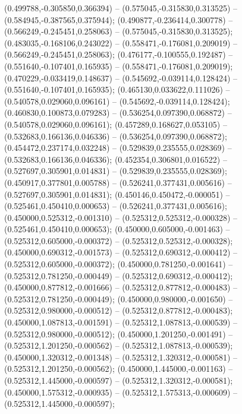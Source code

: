  (0.499788,-0.305850,0.366394) -- (0.575045,-0.315830,0.313525) -- (0.584945,-0.387565,0.375944);
 (0.490877,-0.236414,0.300778) -- (0.566249,-0.245451,0.258063) -- (0.575045,-0.315830,0.313525);
 (0.483035,-0.168106,0.243022) -- (0.558471,-0.176081,0.209019) -- (0.566249,-0.245451,0.258063);
 (0.476177,-0.100555,0.192487) -- (0.551640,-0.107401,0.165935) -- (0.558471,-0.176081,0.209019);
 (0.470229,-0.033419,0.148637) -- (0.545692,-0.039114,0.128424) -- (0.551640,-0.107401,0.165935);
 (0.465130,0.033622,0.111026) -- (0.540578,0.029060,0.096161) -- (0.545692,-0.039114,0.128424);
 (0.460830,0.100873,0.079283) -- (0.536254,0.097390,0.068872) -- (0.540578,0.029060,0.096161);
 (0.457289,0.168627,0.053105) -- (0.532683,0.166136,0.046336) -- (0.536254,0.097390,0.068872);
 (0.454472,0.237174,0.032248) -- (0.529839,0.235555,0.028369) -- (0.532683,0.166136,0.046336);
 (0.452354,0.306801,0.016522) -- (0.527697,0.305901,0.014831) -- (0.529839,0.235555,0.028369);
 (0.450917,0.377801,0.005788) -- (0.526241,0.377431,0.005616) -- (0.527697,0.305901,0.014831);
 (0.450146,0.450472,-0.000051) -- (0.525461,0.450410,0.000653) -- (0.526241,0.377431,0.005616);
 (0.450000,0.525312,-0.001310) -- (0.525312,0.525312,-0.000328) -- (0.525461,0.450410,0.000653);
 (0.450000,0.605000,-0.001463) -- (0.525312,0.605000,-0.000372) -- (0.525312,0.525312,-0.000328);
 (0.450000,0.690312,-0.001573) -- (0.525312,0.690312,-0.000412) -- (0.525312,0.605000,-0.000372);
 (0.450000,0.781250,-0.001641) -- (0.525312,0.781250,-0.000449) -- (0.525312,0.690312,-0.000412);
 (0.450000,0.877812,-0.001666) -- (0.525312,0.877812,-0.000483) -- (0.525312,0.781250,-0.000449);
 (0.450000,0.980000,-0.001650) -- (0.525312,0.980000,-0.000512) -- (0.525312,0.877812,-0.000483);
 (0.450000,1.087813,-0.001591) -- (0.525312,1.087813,-0.000539) -- (0.525312,0.980000,-0.000512);
 (0.450000,1.201250,-0.001491) -- (0.525312,1.201250,-0.000562) -- (0.525312,1.087813,-0.000539);
 (0.450000,1.320312,-0.001348) -- (0.525312,1.320312,-0.000581) -- (0.525312,1.201250,-0.000562);
 (0.450000,1.445000,-0.001163) -- (0.525312,1.445000,-0.000597) -- (0.525312,1.320312,-0.000581);
 (0.450000,1.575312,-0.000935) -- (0.525312,1.575313,-0.000609) -- (0.525312,1.445000,-0.000597);
